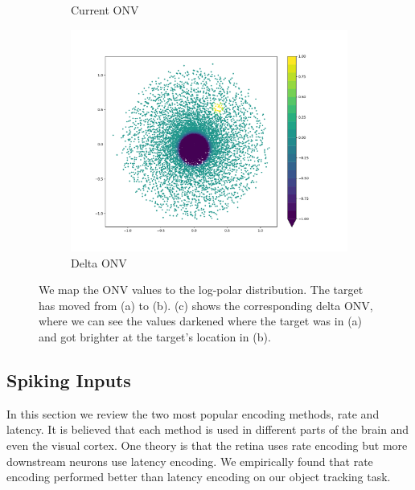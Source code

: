 \documentclass[../taasin.tex]{subfiles}
\begin{document}
\begin{figure}
\begin{subfigure}[b]{0.45\textwidth}
        \caption{Current ONV}
        \label{fig:onv_cur}
    \end{subfigure}
    \hfill
    \begin{subfigure}[b]{0.45\textwidth}
        \centering
        \includegraphics[width=\textwidth]{figures/onv_delta.pdf}
        \caption{Delta ONV}
        \label{fig:onv_delta}
    \end{subfigure}
    \caption{We map the ONV values to the log-polar distribution. The target has moved from (a) to (b). (c) shows the corresponding delta ONV, where we can see the values darkened where the target was in (a) and got brighter at the target's location in (b).}
    \label{fig:three ONVs}
\end{figure}


\subsection{Spiking Inputs}

In this section we review the two most popular encoding methods, rate and latency. It is believed that each method is used in different parts of the brain and even the visual cortex. One theory is that the retina uses rate encoding but more downstream neurons use latency encoding. We empirically found that rate encoding performed better than latency encoding on our object tracking task.
\end{document}
